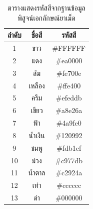 		\begin{table}[H]
			\centering
			\caption{ตารางแสดงรหัสสีจากฐานข้อมูลพิสูจน์เอกลักษณ์ยาเม็ด}
			\label{tab:color-list}
			\begin{tabular}{ | c | c | c | }
			\hline
			\textbf{ลำดับ} &	\textbf{ชื่อสี} & \textbf{รหัสสี}  \\ \hline
			1	&	ขาว		&	\#FFFFFF  \\ \hline
			2	&	แดง		&	\#ea0000  \\ \hline
			3	&	ส้ม		&	 \#fe700e \\ \hline
			4	&	เหลือง	& \#ffe400 \\ \hline
			5	&	ครีม	& \#efeddb \\ \hline
			6	&	เขียว	& \#a8e26a \\ \hline
			7	&	ฟ้า		&	\#4a9fe0 \\ \hline
			8	&	น้ำเงิน   &	  \#120992 \\ \hline  
			9	&	ชมพู	& \#fdb1ef \\ \hline
			10	&	ม่วง	& \#c977db	\\ \hline
			11	&	น้ำตาล	& \#c2924a	\\ \hline
			12	&	เท่า	& \#cccccc	\\ \hline
			13	&   ดำ 	  &   \#000000	\\ \hline
			\end{tabular}
		\end{table}
		






